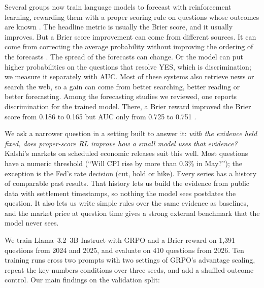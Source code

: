 \documentclass[11pt]{article}
\begin{document}
Several groups now train language models to forecast with reinforcement learning, rewarding them with a proper scoring rule on questions whose outcomes are known \citep{turtel2025outcome,turtel2026proper,chandak2025scaling,afifi2026research,ye2026alphabet,han2026futureworld}. The headline metric is usually the Brier score, and it usually improves. But a Brier score improvement can come from different sources. It can come from correcting the average probability without improving the ordering of the forecasts \citep{vancalster2016hierarchy}. The spread of the forecasts can change. Or the model can put higher probabilities on the questions that resolve YES, which is discrimination; we measure it separately with AUC. Most of these systems also retrieve news or search the web, so a gain can come from better searching, better reading or better forecasting. Among the forecasting studies we reviewed, one reports discrimination for the trained model. There, a Brier reward improved the Brier score from 0.186 to 0.165 but AUC only from 0.725 to 0.751 \citep{turtel2026proper}.

We ask a narrower question in a setting built to answer it: \emph{with the evidence held fixed, does proper-score RL improve how a small model uses that evidence?} Kalshi's markets on scheduled economic releases suit this well. Most questions have a numeric threshold (``Will CPI rise by more than 0.3\% in May?''); the exception is the Fed's rate decision (cut, hold or hike). Every series has a history of comparable past results. That history lets us build the evidence from public data with settlement timestamps, so nothing the model sees postdates the question. It also lets us write simple rules over the same evidence as baselines, and the market price at question time gives a strong external benchmark that the model never sees.

We train Llama~3.2~3B Instruct \citep{grattafiori2024llama3} with GRPO \citep{shao2024deepseekmath} and a Brier reward on 1,391 questions from 2024 and 2025, and evaluate on 410 questions from 2026. Ten training runs cross two prompts with two settings of GRPO's advantage scaling, repeat the key-numbers conditions over three seeds, and add a shuffled-outcome control. Our main findings on the validation split:
\end{document}
